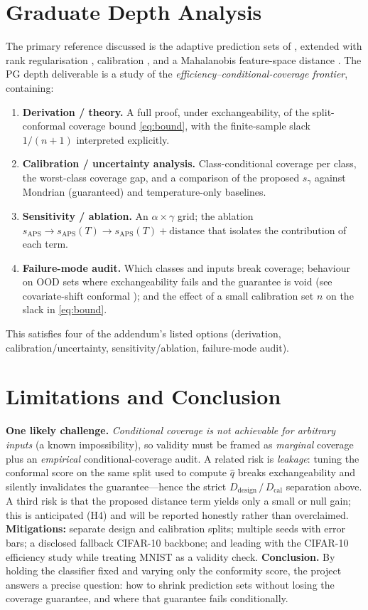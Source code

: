 \documentclass{article}
\begin{document}
\section{Graduate Depth Analysis}
The primary reference discussed is the adaptive prediction sets of
\citet{romano2020classification}, extended with rank regularisation \citep{angelopoulos2021learn},
calibration
\citep{guo2017calibration}, and a Mahalanobis feature-space distance \citep{lee2018simple}. The PG
depth deliverable is a study of the \emph{efficiency--conditional-coverage frontier}, containing:
\begin{enumerate}
  \item \textbf{Derivation / theory.} A full proof, under exchangeability, of the split-conformal
        coverage bound \eqref{eq:bound}, with the finite-sample slack $1/(n+1)$ interpreted
        explicitly.
  \item \textbf{Calibration / uncertainty analysis.} Class-conditional coverage per class, the
        worst-class coverage gap, and a comparison of the proposed $s_\gamma$ against Mondrian
        (guaranteed) and temperature-only baselines.
  \item \textbf{Sensitivity / ablation.} An $\alpha\times\gamma$ grid; the ablation
        $s_{\text{APS}}\to s_{\text{APS}}(T)\to s_{\text{APS}}(T)+\text{distance}$ that isolates the
        contribution of each term.
  \item \textbf{Failure-mode audit.} Which classes and inputs break coverage; behaviour on OOD sets
        where exchangeability fails and the guarantee is void (see covariate-shift conformal
        \citep{tibshirani2019conformal}); and the effect of a small calibration set $n$ on the slack
        in \eqref{eq:bound}.
\end{enumerate}
This satisfies four of the addendum's listed options (derivation, calibration/uncertainty,
sensitivity/ablation, failure-mode audit).

\section{Limitations and Conclusion}
\textbf{One likely challenge.} \emph{Conditional coverage is not achievable for arbitrary inputs}
(a known impossibility), so validity must be framed as \emph{marginal} coverage plus an
\emph{empirical} conditional-coverage audit. A related risk is \emph{leakage}: tuning the conformal
score on the same split used to compute $\hat q$ breaks exchangeability and silently invalidates the
guarantee---hence the strict $D_{\text{design}}\,/\,D_{\text{cal}}$ separation above. A third risk is
that the proposed distance term yields only a small or null gain; this is anticipated (H4) and will
be reported honestly rather than overclaimed. \textbf{Mitigations:} separate design and calibration
splits; multiple seeds with error bars; a disclosed fallback CIFAR-10 backbone; and leading with the
CIFAR-10 efficiency study while treating MNIST as a validity check. \textbf{Conclusion.} By holding
the classifier fixed and varying only the conformity score, the project answers a precise question:
how to shrink prediction sets without losing the coverage guarantee, and where that guarantee fails
conditionally.
\end{document}
